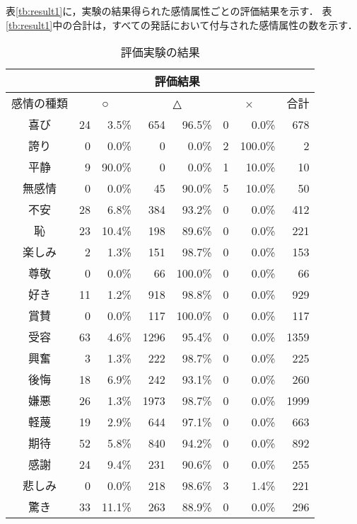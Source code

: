 \documentclass[japanese]{jnlp_1.3c}
\begin{document}
表\ref{tb:result1}に，実験の結果得られた感情属性ごとの評価結果を示す．
表\ref{tb:result1}中の合計は，すべての発話において付与された感情属性の数を示す．


\begin{table}[p]
\begin{center}
\caption{評価実験の結果}
    \renewcommand{\baselinestretch}{}\selectfont
\begin{tabular}{|c||r|r|r|r|r|r||r|}
\hline
	& \multicolumn{6}{c}{評価結果} & \\ \hline
感情の種類 & \multicolumn{2}{|c|}{○} & \multicolumn{2}{|c|}{△} & \multicolumn{2}{|c||}{×}  & 合計 \\ \hline \hline
喜び	&	24	&	3.5\%	&	654	&	96.5\%	&	0	&	0.0\%	&	678 \\ \hline
誇り	&	0	&	0.0\%	&	0	&	0.0\%	&	2	&	100.0\%	&	2 \\ \hline
平静	&	9	&	90.0\%	&	0	&	0.0\%	&	1	&	10.0\%	&	10 \\ \hline
無感情  &	0	&	0.0\%	&	45	&	90.0\%	&	5	&	10.0\%	&	50 \\ \hline
不安	&	28	&	6.8\%	&	384	&	93.2\%	&	0	&	0.0\%	&	412 \\ \hline
恥	&	23	&	10.4\%	&	198	&	89.6\%	&	0	&	0.0\%	&	221 \\ \hline
楽しみ	&	2	&	1.3\%	&	151	&	98.7\%	&	0	&	0.0\%	&	153 \\ \hline
尊敬	&	0	&	0.0\%	&	66	&	100.0\%	&	0	&	0.0\%	&	66 \\ \hline
好き	&	11	&	1.2\%	&	918	&	98.8\%	&	0	&	0.0\%	&	929 \\ \hline
賞賛	&	0	&	0.0\%	&	117	&	100.0\%	&	0	&	0.0\%	&	117 \\ \hline
受容	&	63	&	4.6\%	&	1296	&	95.4\%	&	0	&	0.0\%	&	1359 \\ \hline
興奮	&	3	&	1.3\%	&	222	&	98.7\%	&	0	&	0.0\%	&	225 \\ \hline
後悔	&	18	&	6.9\%	&	242	&	93.1\%	&	0	&	0.0\%	&	260 \\ \hline
嫌悪	&	26	&	1.3\%	&	1973	&	98.7\%	&	0	&	0.0\%	&	1999 \\ \hline
軽蔑	&	19	&	2.9\%	&	644	&	97.1\%	&	0	&	0.0\%	&	663 \\ \hline
期待	&	52	&	5.8\%	&	840	&	94.2\%	&	0	&	0.0\%	&	892 \\ \hline
感謝	&	24	&	9.4\%	&	231	&	90.6\%	&	0	&	0.0\%	&	255 \\ \hline
悲しみ	&	0	&	0.0\%	&	218	&	98.6\%	&	3	&	1.4\%	&	221 \\ \hline
驚き	&	33	&	11.1\%	&	263	&	88.9\%	&	0	&	0.0\%	&	296 \\ \hline

\end{tabular}
\end{center}
\end{table}
\end{document}
